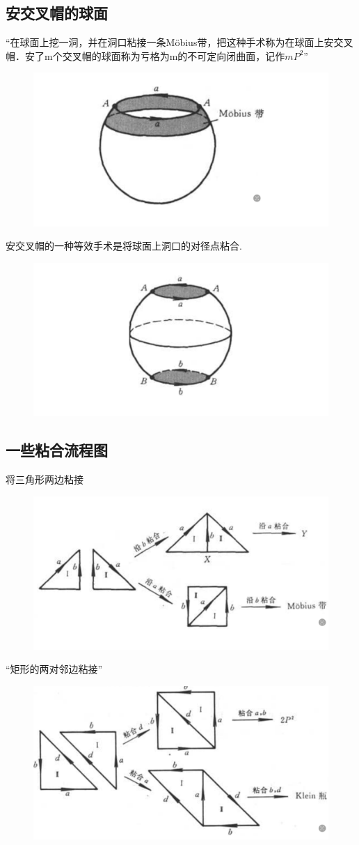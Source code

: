 \subsection*{安交叉帽的球面}
“在球面上挖一洞，并在洞口粘接一条Möbius带，把这种手术称为在球面上安交叉帽．安了m个交叉帽的球面称为亏格为m的不可定向闭曲面，记作\(mP^2\)”
\begin{figure}[H]
    \centering
    \includegraphics[width=0.5\linewidth]{image_13.png}
    \caption{}
    \label{fig:enter-label_13}
\end{figure}
安交叉帽的一种等效手术是将球面上洞口的对径点粘合.
\begin{figure}[H]
    \centering
    \includegraphics[width=0.5\linewidth]{image_14.png}
    \caption{}
    \label{fig:enter-label_14}
\end{figure}

\subsection*{一些粘合流程图}
将三角形两边粘接
\begin{figure}[H]
    \centering
    \includegraphics[width=0.5\linewidth]{image_15.png}
    \caption{}
    \label{fig:enter-label_15}
\end{figure}
“矩形的两对邻边粘接”
\begin{figure}[H]
    \centering
    \includegraphics[width=0.4\linewidth]{image_16.png}
    \caption{}
    \label{fig:enter-label_16}
\end{figure}
